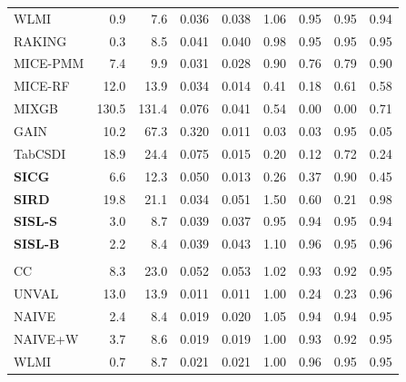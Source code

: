 \begin{landscape}
\begin{longtable}{lrrrrrrrr}
WLMI & \cellcolor{ranktwo}0.9 & \cellcolor{rankone}7.6 & 0.036 & 0.038 & 1.06 & \cellcolor{rankone}0.95 & \cellcolor{rankone}0.95 & \cellcolor{ranktwo}0.94 \\
RAKING & \cellcolor{rankone}0.3 & \cellcolor{rankthree}8.5 & 0.041 & 0.040 & \cellcolor{ranktwo}0.98 & \cellcolor{rankone}0.95 & \cellcolor{rankone}0.95 & \cellcolor{rankone}0.95 \\
MICE-PMM & 7.4 & 9.9 & 0.031 & 0.028 & 0.90 & \cellcolor{rankthree}0.76 & \cellcolor{rankthree}0.79 & 0.90 \\
MICE-RF & 12.0 & 13.9 & 0.034 & 0.014 & 0.41 & 0.18 & 0.61 & 0.58 \\
MIXGB & 130.5 & 131.4 & 0.076 & 0.041 & 0.54 & 0.00 & 0.00 & 0.71 \\
GAIN & 10.2 & 67.3 & 0.320 & 0.011 & 0.03 & 0.03 & \cellcolor{rankone}0.95 & 0.05 \\
TabCSDI & 18.9 & 24.4 & 0.075 & 0.015 & 0.20 & 0.12 & 0.72 & 0.24 \\
\textbf{SICG} & 6.6 & 12.3 & 0.050 & 0.013 & 0.26 & 0.37 & \cellcolor{ranktwo}0.90 & 0.45 \\
\textbf{SIRD} & 19.8 & 21.1 & 0.034 & 0.051 & 1.50 & 0.60 & 0.21 & 0.98 \\
\textbf{SISL-S} & 3.0 & 8.7 & 0.039 & 0.037 & \cellcolor{rankthree}0.95 & \cellcolor{ranktwo}0.94 & \cellcolor{rankone}0.95 & \cellcolor{ranktwo}0.94 \\
\textbf{SISL-B} & \cellcolor{rankthree}2.2 & \cellcolor{ranktwo}8.4 & 0.039 & 0.043 & 1.10 & \cellcolor{ranktwo}0.96 & \cellcolor{rankone}0.95 & \cellcolor{ranktwo}0.96 \\
\addlinespace[3pt]
\multicolumn{9}{l}{\textbf{Continuous Phase-One Covariates}} \\
\addlinespace[2pt]
CC & 8.3 & 23.0 & 0.052 & 0.053 & \cellcolor{ranktwo}1.02 & \cellcolor{rankthree}0.93 & \cellcolor{rankthree}0.92 & \cellcolor{rankone}0.95 \\
UNVAL & 13.0 & 13.9 & 0.011 & 0.011 & \cellcolor{rankone}1.00 & 0.24 & 0.23 & \cellcolor{ranktwo}0.96 \\
NAIVE & 2.4 & 8.4 & 0.019 & 0.020 & 1.05 & \cellcolor{ranktwo}0.94 & \cellcolor{ranktwo}0.94 & \cellcolor{rankone}0.95 \\
NAIVE+W & 3.7 & 8.6 & 0.019 & 0.019 & \cellcolor{rankone}1.00 & \cellcolor{rankthree}0.93 & \cellcolor{rankthree}0.92 & \cellcolor{rankone}0.95 \\
WLMI & \cellcolor{rankthree}0.7 & 8.7 & 0.021 & 0.021 & \cellcolor{rankone}1.00 & \cellcolor{ranktwo}0.96 & \cellcolor{rankone}0.95 & \cellcolor{rankone}0.95 \\

\end{longtable}
\end{landscape}

